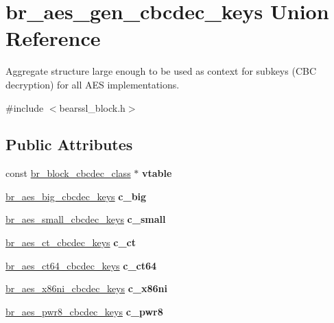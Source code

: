 \hypertarget{unionbr__aes__gen__cbcdec__keys}{}\section{br\+\_\+aes\+\_\+gen\+\_\+cbcdec\+\_\+keys Union Reference}
\label{unionbr__aes__gen__cbcdec__keys}


Aggregate structure large enough to be used as context for subkeys (C\+BC decryption) for all A\+ES implementations.  




{\ttfamily \#include $<$bearssl\+\_\+block.\+h$>$}

\subsection*{Public Attributes}
\begin{DoxyCompactItemize}
\item 
\mbox{\label{unionbr__aes__gen__cbcdec__keys_abdce2dc2164e1f6a1ff440f56727c0ff}} 
const \hyperlink{bearssl__block_8h_a5542970c820eeee2e62766368be8fb7f}{br\+\_\+block\+\_\+cbcdec\+\_\+class} $\ast$ {\bfseries vtable}
\item 
\mbox{\label{unionbr__aes__gen__cbcdec__keys_a9590f0ae086214d4083a00a58fc2e93a}} 
\hyperlink{structbr__aes__big__cbcdec__keys}{br\+\_\+aes\+\_\+big\+\_\+cbcdec\+\_\+keys} {\bfseries c\+\_\+big}
\item 
\mbox{\label{unionbr__aes__gen__cbcdec__keys_a85887e2199ad5e229e5eac65680c1ed2}} 
\hyperlink{structbr__aes__small__cbcdec__keys}{br\+\_\+aes\+\_\+small\+\_\+cbcdec\+\_\+keys} {\bfseries c\+\_\+small}
\item 
\mbox{\label{unionbr__aes__gen__cbcdec__keys_ab6b483874b06c20ff5041b231e3ab9d8}} 
\hyperlink{structbr__aes__ct__cbcdec__keys}{br\+\_\+aes\+\_\+ct\+\_\+cbcdec\+\_\+keys} {\bfseries c\+\_\+ct}
\item 
\mbox{\label{unionbr__aes__gen__cbcdec__keys_a0edf844aaa62dc621621137269cdec47}} 
\hyperlink{structbr__aes__ct64__cbcdec__keys}{br\+\_\+aes\+\_\+ct64\+\_\+cbcdec\+\_\+keys} {\bfseries c\+\_\+ct64}
\item 
\mbox{\label{unionbr__aes__gen__cbcdec__keys_a6dc6ca7c47e2a8af64d2e67c4ce87439}} 
\hyperlink{structbr__aes__x86ni__cbcdec__keys}{br\+\_\+aes\+\_\+x86ni\+\_\+cbcdec\+\_\+keys} {\bfseries c\+\_\+x86ni}
\item 
\mbox{\label{unionbr__aes__gen__cbcdec__keys_a01ffa3d3179f916233efa8b22a386f65}} 
\hyperlink{structbr__aes__pwr8__cbcdec__keys}{br\+\_\+aes\+\_\+pwr8\+\_\+cbcdec\+\_\+keys} {\bfseries c\+\_\+pwr8}
\end{DoxyCompactItemize}



